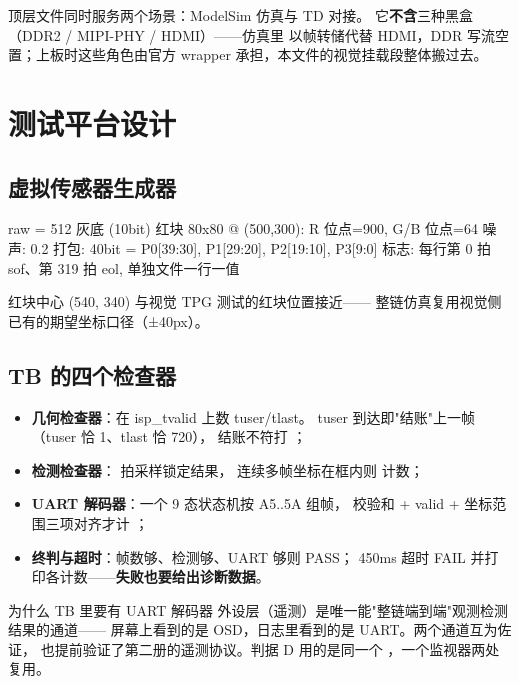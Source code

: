 顶层文件同时服务两个场景：ModelSim 仿真与 TD 对接。
它\textbf{不含}三种黑盒（DDR2 / MIPI-PHY / HDMI）——仿真里
以帧转储代替 HDMI，DDR 写流空置；上板时这些角色由官方
wrapper 承担，本文件的视觉挂载段整体搬过去。

\section{测试平台设计}

\subsection{虚拟传感器生成器}

\begin{Verilog}
raw = 512 灰底 (10bit)
红块 80x80 @ (500,300): R 位点=900, G/B 位点=64
噪声: 0.2%
打包: 40bit = {P0[39:30], P1[29:20], P2[19:10], P3[9:0]}
标志: 每行第 0 拍 sof、第 319 拍 eol, 单独文件一行一值
\end{Verilog}

红块中心 (540, 340) 与视觉 TPG 测试的红块位置接近——
整链仿真复用视觉侧已有的期望坐标口径（±40px）。

\subsection{TB 的四个检查器}

\begin{itemize}
  \item \textbf{几何检查器}：在 isp\_tvalid 上数 tuser/tlast。
    tuser 到达即"结账"上一帧（tuser 恰 1、tlast 恰 720），
    结账不符打 ；
  \item \textbf{检测检查器}： 拍采样锁定结果，
    连续多帧坐标在框内则  计数；
  \item \textbf{UART 解码器}：一个 9 态状态机按 A5..5A 组帧，
    校验和 + valid + 坐标范围三项对齐才计 ；
  \item \textbf{终判与超时}：帧数够、检测够、UART 够则 PASS；
    450ms 超时 FAIL 并打印各计数——\textbf{失败也要给出诊断数据}。
\end{itemize}

\begin{keybox}{为什么 TB 里要有 UART 解码器}
外设层（遥测）是唯一能"整链端到端"观测检测结果的通道——
屏幕上看到的是 OSD，日志里看到的是 UART。两个通道互为佐证，
也提前验证了第二册的遥测协议。判据 D 用的是同一个
，一个监视器两处复用。
\end{keybox}


